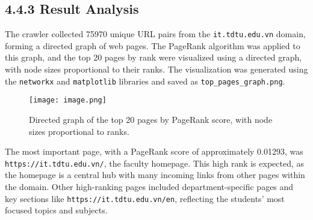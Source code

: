 \documentclass{article}
\begin{document}
\subsection*{4.4.3 Result Analysis}

The crawler collected 75970 unique URL pairs from the \texttt{it.tdtu.edu.vn} domain, forming a directed graph of web pages. The PageRank algorithm was applied to this graph, and the top 20 pages by rank were visualized using a directed graph, with node sizes proportional to their ranks. The visualization was generated using the \texttt{networkx} and \texttt{matplotlib} libraries and saved as \texttt{top\_pages\_graph.png}.

\begin{figure}[h]
    \centering
    \texttt{[image: image.png]}
    \caption{Directed graph of the top 20 pages by PageRank score, with node sizes proportional to ranks.}
    \label{fig:top_pages_graph}
\end{figure}

The most important page, with a PageRank score of approximately 0.01293, was \texttt{https://it.tdtu.edu.vn/}, the faculty homepage. This high rank is expected, as the homepage is a central hub with many incoming links from other pages within the domain. Other high-ranking pages included department-specific pages and key sections like \texttt{https://it.tdtu.edu.vn/en}, reflecting the students' most focused topics and subjects.
\end{document}
